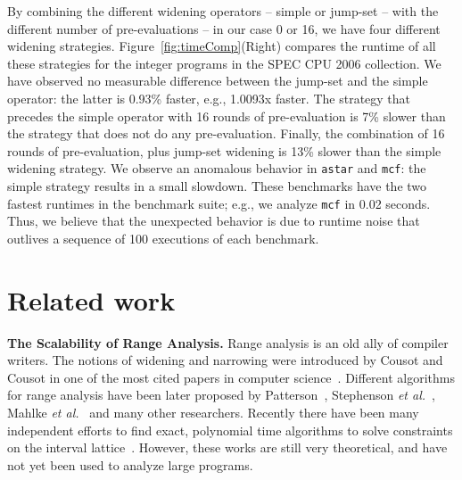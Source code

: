 \documentclass[preprint]{elsarticle}
\begin{document}
By combining the different widening operators -- simple or jump-set -- with
the different number of pre-evaluations -- in our case 0 or 16, we have four
different widening strategies.
Figure~\ref{fig:timeComp}(Right) compares the runtime of all these strategies
for the integer programs in the SPEC CPU 2006 collection.
We have observed no measurable difference between the jump-set and the simple
operator: the latter is 0.93\% faster, e.g., 1.0093x faster.
The strategy that precedes the simple operator with 16 rounds of pre-evaluation
is 7\% slower than the strategy that does not do any pre-evaluation.
Finally, the combination of 16 rounds of pre-evaluation, plus jump-set widening
is 13\% slower than the simple widening strategy.
We observe an anomalous behavior in \texttt{astar} and \texttt{mcf}: the simple
strategy results in a small slowdown.
These benchmarks have the two fastest runtimes in the benchmark suite; e.g.,
we analyze \texttt{mcf} in 0.02 seconds.
Thus, we believe that the unexpected behavior is due to runtime noise that
outlives a sequence of 100 executions of each benchmark.


\section{Related work}
\label{sec:rel}

\noindent
\textbf{The Scalability of Range Analysis. }
Range analysis is an old ally of compiler writers.
The notions of widening and narrowing were introduced by Cousot and Cousot in
one of the most cited papers in computer science~\cite{Cousot77}.
Different algorithms for range analysis have been later proposed
by Patterson~\cite{Patterson95}, Stephenson {\em et al.}~\cite{Stephenson00},
Mahlke {\em et al.}~\cite{Mahlke01} and many other researchers.
Recently there have been many independent efforts to find exact, polynomial
time algorithms to solve constraints on the interval
lattice~\cite{Gawlitza09,Su05,Costan05,Lakhdar11,Su04}.
However, these works are still very theoretical, and have not yet been used to
analyze large programs.
\end{document}
